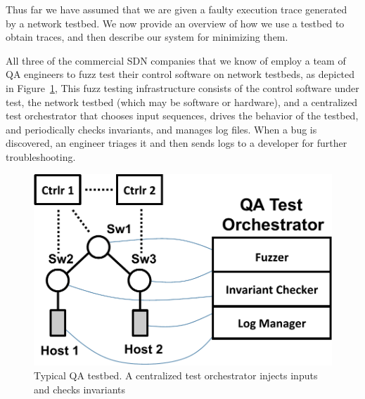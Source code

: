 
Thus far we have assumed that we are given a faulty execution
trace generated by a network testbed. We now provide an overview of
how we use a testbed to obtain traces, and then describe our system for
minimizing them.

 All three of the commercial SDN companies
that we know of employ a team of QA
engineers to fuzz test their control software on network testbeds,
as depicted in Figure~\ref{fig:qa_cluster},
This fuzz testing infrastructure
consists of the control software under test, the network testbed (which may
be software or hardware), and a centralized
test orchestrator
that chooses input sequences, drives the behavior of the testbed,
and periodically checks invariants, and manages log files. When a bug is discovered, an
engineer triages it and then sends logs to a developer for further troubleshooting.

\begin{figure}[tb]
    \centering
    \hspace{-10pt}
    \includegraphics{../diagrams/architecture/qa_cluster.pdf}
    \caption{Typical QA testbed. A centralized test
    orchestrator injects inputs and checks invariants}
    \label{fig:qa_cluster}
\end{figure}

